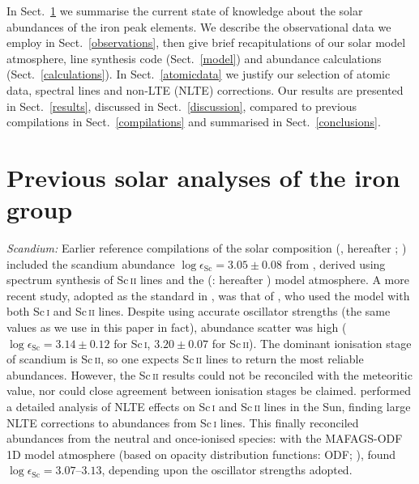 \documentclass[traditabstract]{aa}
\begin{document}
In Sect.~\ref{previouswork} we summarise the current state of knowledge about the solar abundances of the iron peak elements.  We describe the observational data we employ in Sect.~\ref{observations}, then give brief recapitulations of our solar model atmosphere, line synthesis code (Sect.~\ref{model}) and abundance calculations (Sect.~\ref{calculations}).  In Sect.~\ref{atomicdata} we justify our selection of atomic data, spectral lines and non-LTE (NLTE) corrections.  Our results are presented in Sect.~\ref{results}, discussed in Sect.~\ref{discussion}, compared to previous compilations in Sect.~\ref{compilations} and summarised in Sect.~\ref{conclusions}.

\section{Previous solar analyses of the iron group}
\label{previouswork}

\textit{Scandium:} Earlier reference compilations of the solar composition (\citealt{GS98}, hereafter ; ) 
included the scandium abundance $\log \epsilon_\mathrm{Sc}=3.05\pm0.08$ from \citet{Youssef89},
derived using spectrum synthesis of Sc\,\textsc{ii} lines and the \citeauthor{HM} (\citeyear{HM}: hereafter ) model atmosphere.
A more recent study, adopted as the standard in \citet{Grevesse07}, was that of \citet{Neuforge93}, who used
the  model with both Sc\,\textsc{i} and Sc\,\textsc{ii} lines.  Despite using accurate oscillator
strengths (the same values as we use in this paper in fact), abundance scatter was high
($\log \epsilon_\mathrm{Sc}=3.14\pm0.12$ for Sc\,\textsc{i}, $3.20\pm0.07$ for Sc\,\textsc{ii}).
The dominant ionisation stage of scandium is Sc\,\textsc{ii}, so one expects Sc\,\textsc{ii} lines to return
the most reliable abundances.  However, the Sc\,\textsc{ii} results could not be reconciled with the meteoritic
value, nor could close agreement between ionisation stages be claimed.  \citet{Zhang08} performed
a detailed analysis of NLTE effects on Sc\,\textsc{i} and Sc\,\textsc{ii} lines in the Sun, finding
large NLTE corrections to abundances from Sc\,\textsc{i} lines.  This finally reconciled abundances
from the neutral and once-ionised species: with the MAFAGS-ODF 1D model atmosphere (based on opacity
distribution functions: ODF; \citealt{Fuhrmann97}), \citeauthor{Zhang08} found $\log \epsilon_\mathrm{Sc}=3.07$--$3.13$, depending upon
the oscillator strengths adopted.
\end{document}
